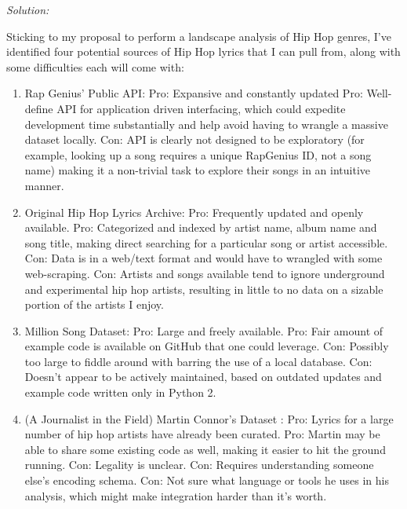 \documentclass[11pt]{article}
\newenvironment{solution}{
	\vspace{10px}\noindent\emph{Solution:}
}{
	\vspace{10px}
}
\begin{document}
\begin{solution}
	
	Sticking to my proposal to perform a landscape analysis of Hip Hop genres, I've identified four potential sources of Hip Hop lyrics that I can pull from, along with some difficulties each will come with: 
	
	\begin{enumerate}
		\item Rap Genius' Public API:
			\subitem Pro: Expansive and constantly updated
			\subitem Pro: Well-define API for application driven interfacing, which could expedite development time substantially and help avoid having to wrangle a massive dataset locally.
			\subitem Con: API is clearly not designed to be exploratory (for example, looking up a song requires a unique RapGenius ID, not a song name) making it a non-trivial task to explore their songs in an intuitive manner. 
		\item Original Hip Hop Lyrics Archive: 
			\subitem Pro: Frequently updated and openly available. 
			\subitem Pro: Categorized and indexed by artist name, album name and song title, making direct searching for a particular song or artist accessible.
			\subitem Con: Data is in a web/text format and would have to wrangled with some web-scraping.
			\subitem Con: Artists and songs available tend to ignore underground and experimental hip hop artists, resulting in little to no data on a sizable portion of the artists I enjoy. 
		\item Million Song Dataset:
			\subitem Pro: Large and freely available.
			\subitem Pro: Fair amount of example code is available on GitHub that one could leverage.
			\subitem Con: Possibly too large to fiddle around with barring the use of a local database.
			\subitem Con: Doesn't appear to be actively maintained, based on outdated updates and example code written only in Python 2.
		\item (A Journalist in the Field) Martin Connor's Dataset :
		 	\subitem Pro: Lyrics for a large number of hip hop artists have already been curated. 
		 	\subitem Pro: Martin may be able to share some existing code as well, making it easier to hit the ground running.
		 	\subitem Con: Legality is unclear.
		 	\subitem Con: Requires understanding someone else's encoding schema.
		 	\subitem Con: Not sure what language or tools he uses in his analysis, which might make integration harder than it's worth.
	\end{enumerate}

\end{solution} 
\end{document}
